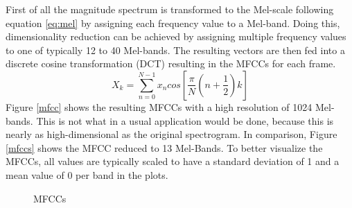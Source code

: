\FloatBarrier
\noindent First of all the magnitude spectrum is transformed to the Mel-scale following equation \ref{eq:mel} by assigning each frequency value to a Mel-band.
Doing this, dimensionality reduction can be achieved by assigning multiple frequency values to one of typically 12 to 40 Mel-bands. The resulting vectors are then fed into a discrete cosine transformation (DCT) resulting in the MFCCs for each frame. 
\begin{equation} \label{eq:dct}
X_k = \sum_{n=0}^{N-1}{x_n cos\left[{\frac{\pi}{N}(n + \frac{1}{2})k}\right]}
\end{equation}
Figure \ref{mfcc} shows the resulting MFCCs with a high resolution of 1024 Mel-bands. This is not what in a usual application would be done, because this is nearly as high-dimensional as the original spectrogram. In comparison, Figure \ref{mfccs} shows the MFCC reduced to 13 Mel-Bands.
To better visualize the MFCCs, all values are typically scaled to have a standard deviation of 1 and a mean value of 0 per band in the plots. 
\begin{figure}[htbp]
	\centering
	\caption{MFCCs}	
	\label{fig:mfcc}
\end{figure}
